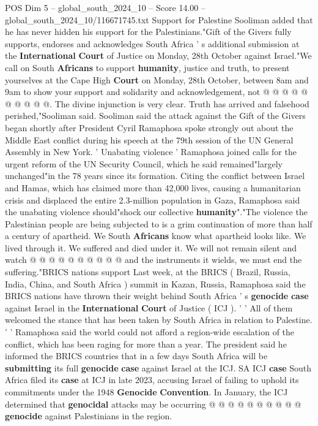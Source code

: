 \begin{textsample}{POS Dim 5 – global\_south\_2024\_10 – Score 14.00 – global\_south\_2024\_10/116671745.txt}
Support for Palestine Sooliman added that he has never hidden his support for the Palestinians."Gift of the Givers fully supports, endorses and acknowledges South Africa ' s additional submission at the \textbf{International} \textbf{Court} of Justice on Monday, 28th October against Israel."We call on South \textbf{Africans} to support \textbf{humanity}, justice and truth, to present yourselves at the Cape High \textbf{Court} on Monday, 28th October, between 8am and 9am to show your support and solidarity and acknowledgement, not @ @ @ @ @ @ @ @ @ @.
The divine injunction is very clear.
Truth has arrived and falsehood perished,"Sooliman said.
Sooliman said the attack against the Gift of the Givers began shortly after President Cyril Ramaphosa spoke strongly out about the Middle East conflict during his speech at the 79th session of the UN General Assembly in New York. ' Unabating violence ' Ramaphosa joined calls for the urgent reform of the UN Security Council, which he said remained"largely unchanged"in the 78 years since its formation.
Citing the conflict between Israel and Hamas, which has claimed more than 42,000 lives, causing a humanitarian crisis and displaced the entire 2.3-million population in Gaza, Ramaphosa said the unabating violence should"shock our collective \textbf{humanity}"."The violence the Palestinian people are being subjected to is a grim continuation of more than half a century of apartheid.
We South \textbf{Africans} know what apartheid looks like.
We lived through it.
We suffered and died under it.
We will not remain silent and watch @ @ @ @ @ @ @ @ @ @ and the instruments it wields, we must end the suffering."BRICS nations support Last week, at the BRICS ( Brazil, Russia, India, China, and South Africa ) summit in Kazan, Russia, Ramaphosa said the BRICS nations have thrown their weight behind South Africa ' s \textbf{genocide} \textbf{case} against Israel in the \textbf{International} \textbf{Court} of Justice ( ICJ ). ' ' All of them welcomed the stance that has been taken by South Africa in relation to Palestine. ' ' Ramaphosa said the world could not afford a region-wide escalation of the conflict, which has been raging for more than a year.
The president said he informed the BRICS countries that in a few days South Africa will be \textbf{submitting} its full \textbf{genocide} \textbf{case} against Israel at the ICJ.
SA ICJ \textbf{case} South Africa filed its \textbf{case} at ICJ in late 2023, accusing Israel of failing to uphold its commitments under the 1948 \textbf{Genocide} \textbf{Convention}.
In January, the ICJ determined that \textbf{genocidal} attacks may be occurring @ @ @ @ @ @ @ @ @ @ \textbf{genocide} against Palestinians in the region.

\end{textsample}
